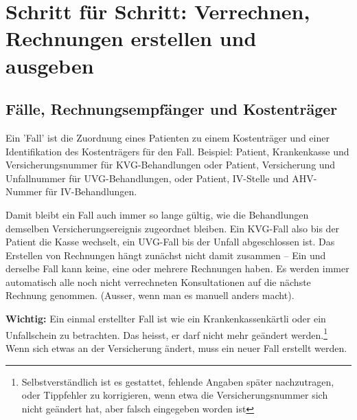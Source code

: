 \documentclass[a4paper]{scrartcl}
\begin{document}
\section{Schritt für Schritt: Verrechnen, Rechnungen erstellen und ausgeben}
\label{rechnungenerstellen}
\subsection{Fälle, Rechnungsempfänger und Kostenträger}
Ein 'Fall' ist die Zuordnung eines Patienten zu einem Kostenträger und einer Identifikation des Kostenträgers für den Fall. Beispiel: Patient, Krankenkasse und Versicherungsnummer für KVG-Behandlungen oder Patient, Versicherung und Unfallnummer für UVG-Behandlungen, oder Patient, IV-Stelle und AHV-Nummer für IV-Behandlungen.

\medskip

Damit bleibt ein Fall auch immer so lange gültig, wie die Behandlungen demselben Versicherungsereignis zugeordnet bleiben. Ein KVG-Fall also bis der Patient die Kasse wechselt, ein UVG-Fall bis der Unfall abgeschlossen ist. Das Erstellen von Rechnungen hängt zunächst nicht damit zusammen -- Ein und derselbe Fall kann keine, eine oder mehrere Rechnungen haben. Es werden immer automatisch alle noch nicht verrechneten Konsultationen auf die nächste Rechnung genommen. (Ausser, wenn man es manuell anders macht).

\medskip

\textbf{Wichtig:} Ein einmal erstellter Fall ist wie ein Krankenkassenkärtli oder ein
 Unfallschein zu betrachten. Das heisst, er darf nicht mehr geändert werden.\footnote{Selbstverständlich ist es gestattet, fehlende Angaben später nachzutragen, oder Tippfehler zu korrigieren, wenn etwa die Versicherungsnummer sich nicht geändert hat, aber falsch eingegeben worden ist} Wenn sich etwas an der Versicherung ändert, muss ein neuer Fall erstellt werden.
\end{document}
